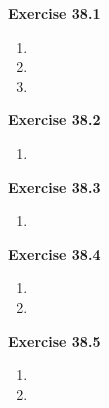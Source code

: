 




\textbf{Exercise 38.1}
\begin{enumerate}
    \item 
    \item 
    \item 
\end{enumerate}

\textbf{Exercise 38.2}
\begin{enumerate}
    \item 
\end{enumerate}

\textbf{Exercise 38.3}
\begin{enumerate}
    \item 
\end{enumerate}

\textbf{Exercise 38.4}
\begin{enumerate}
    \item 
    \item 
\end{enumerate}

\textbf{Exercise 38.5}
\begin{enumerate}
    \item 
    \item 
\end{enumerate}

